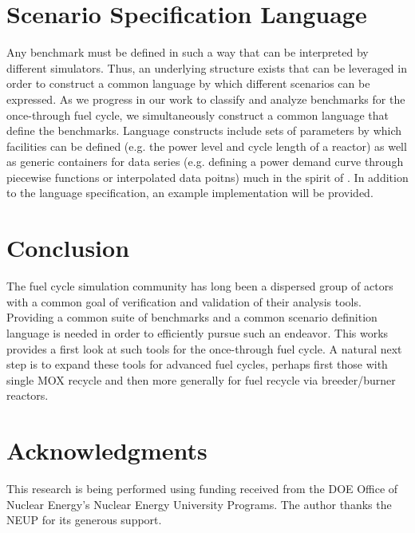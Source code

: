 \documentclass{anstrans}
\begin{document}
\section{Scenario Specification Language}
Any benchmark must be defined in such a way that can be interpreted by
different simulators. Thus, an underlying structure exists that can be
leveraged in order to construct a common language by which different
scenarios can be expressed. As we progress in our work to classify and
analyze benchmarks for the once-through fuel cycle, we simultaneously
construct a common language that define the benchmarks. Language 
constructs include sets of parameters by which facilities can be
defined (e.g. the power level and cycle length of a reactor) as well
as generic containers for data series (e.g. defining a power demand 
curve through piecewise functions or interpolated data poitns) much
in the spirit of \cite{mattoon_gneralized_2012}. In addition to the
language specification, an example implementation will be provided.

\section{Conclusion}
The fuel cycle simulation community has long been a dispersed group
of actors with a common goal of verification and validation of their
analysis tools. Providing a common suite of benchmarks and a common
scenario definition language is needed in order to efficiently pursue
such an endeavor. This works provides a first look at such tools for
the once-through fuel cycle. A natural next step is to expand these
tools for advanced fuel cycles, perhaps first those with single MOX
recycle and then more generally for fuel recycle via breeder/burner
reactors.

\section{Acknowledgments}
This research is being performed using funding received from the DOE
Office of Nuclear Energy's Nuclear Energy University Programs.  The
author thanks the NEUP for its generous support.


\end{document}
